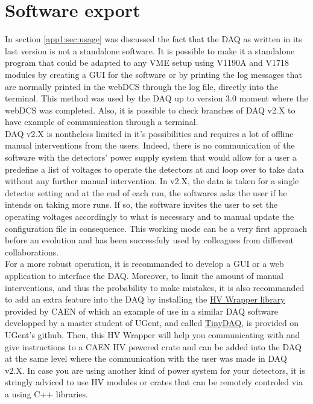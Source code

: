 \section{Software export}
\label{app1:sec:export}
	
	In section \ref{app1:sec:usage} was discussed the fact that the DAQ as written in its last version is not a standalone software. It is possible to make it a standalone program that could be adapted to any VME setup using V1190A and V1718 modules by creating a GUI for the software or by printing the log messages that are normally printed in the webDCS through the log file, directly into the terminal. This method was used by the DAQ up to version 3.0 moment where the webDCS was completed. Also, it is possible to check branches of DAQ v2.X to have example of communication through a terminal.\\
	
	DAQ v2.X is nontheless limited in it's possibilities and requires a lot of offline manual interventions from the users. Indeed, there is no communication of the software with the detectors' power supply system that would allow for a user a predefine a list of voltages to operate the detectors at and loop over to take data without any further manual intervention. In v2.X, the data is taken for a single detector setting and at the end of each run, the softwares asks the user if he intends on taking more runs. If so, the software invites the user to set the operating voltages accordingly to what is necessary and to manual update the configuration file in consequence. This working mode can be a very first approach before an evolution and has been successfuly used by colleagues from different collaborations.\\
	
	For a more robust operation, it is recommanded to develop a GUI or a web application to interface the DAQ. Moreover, to limit the amount of manual interventions, and thus the probability to make mistakes, it is also recommanded to add an extra feature into the DAQ by installing the \href{http://caen.it/csite/CaenProd.jsp?idmod=835&parent=42}{HV Wrapper library} provided by CAEN of which an example of use in a similar DAQ software developped by a master student of UGent, and called \href{https://github.ugent.be/favassch/TinyDAQ}{TinyDAQ}, is provided on UGent's github. Then, this HV Wrapper will help you communicating with and give instructions to a CAEN HV powered crate and can be added into the DAQ at the same level where the communication with the user was made in DAQ v2.X. In case you are using another kind of power system for your detectors, it is stringly adviced to use HV modules or crates that can be remotely controled via a using C++ libraries.\\

\clearpage{\pagestyle{empty}\cleardoublepage}

